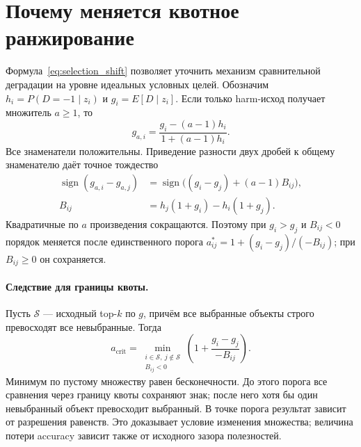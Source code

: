 \section{Почему меняется квотное ранжирование}
\label{sec:ranking_shift}
Формула~\eqref{eq:selection_shift} позволяет уточнить механизм
сравнительной деградации на уровне идеальных условных целей.
Обозначим $h_i=P(D=-1\mid z_i)$ и $g_i=E[D\mid z_i]$.
Если только harm-исход получает множитель $a\ge1$, то
\begin{equation}\label{eq:harm_target}
g_{a,i}=\frac{g_i-(a-1)h_i}{1+(a-1)h_i}.
\end{equation}
Все знаменатели положительны. Приведение разности двух дробей
к общему знаменателю даёт точное тождество
\begin{equation}\label{eq:rank_numerator}
\begin{aligned}
\operatorname{sign}(g_{a,i}-g_{a,j})
&=\operatorname{sign}\bigl((g_i-g_j)+(a-1)B_{ij}\bigr),\\
B_{ij}&=h_j(1+g_i)-h_i(1+g_j).
\end{aligned}
\end{equation}
Квадратичные по $a$ произведения сокращаются. Поэтому при $g_i>g_j$
и $B_{ij}<0$ порядок меняется после единственного порога
$a_{ij}^{*}=1+(g_i-g_j)/(-B_{ij})$; при $B_{ij}\ge0$ он сохраняется.

\paragraph{Следствие для границы квоты.}
Пусть $\mathcal S$ --- исходный top-$k$ по $g$, причём все выбранные
объекты строго превосходят все невыбранные. Тогда
\begin{equation}\label{eq:critical_multiplier}
a_{\mathrm{crit}}=
\min_{\substack{i\in\mathcal S,\ j\notin\mathcal S\\B_{ij}<0}}
\left(1+\frac{g_i-g_j}{-B_{ij}}\right).
\end{equation}
Минимум по пустому множеству равен бесконечности.
До этого порога все сравнения через границу квоты сохраняют знак;
после него хотя бы один невыбранный объект превосходит выбранный.
В точке порога результат зависит от разрешения равенств.
Это доказывает условие изменения множества; величина потери accuracy
зависит также от исходного зазора полезностей.

